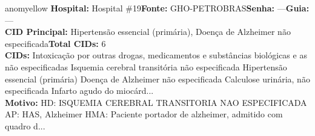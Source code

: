 \documentclass[a4paper,10pt]{article}
\begin{document}
\begin{anomalycard}[Interna\c{c}\~{a}o \#167215 | Pac. \#80471 | MODERADO (z=2.34) | LOS: 22d | 01/03/2026\,$\to$\,—]{anomyellow}
\textbf{Hospital:} Hospital \#19\quad \textbf{Fonte:} GHO-PETROBRAS\quad \textbf{Senha:} ---\quad \textbf{Guia:} ---\\

\textbf{CID Principal:} {\small Hipertensão essencial (primária), Doença de Alzheimer não especificada}\quad\textbf{Total CIDs:} 6\\

\textbf{CIDs:} {\scriptsize Intoxicação por outras drogas, medicamentos e substâncias biológicas e as não especificadas \textbar{} Isquemia cerebral transitória não especificada \textbar{} Hipertensão essencial (primária) \textbar{} Doença de Alzheimer não especificada \textbar{} Calculose urinária, não especificada \textbar{} Infarto agudo do miocárd...}\\

\textbf{Motivo:} {\scriptsize HD: ISQUEMIA CEREBRAL TRANSITORIA NAO ESPECIFICADA AP: HAS, Alzheimer HMA: Paciente portador de alzheimer, admitido com quadro d...}\\




\end{anomalycard}
\end{document}
